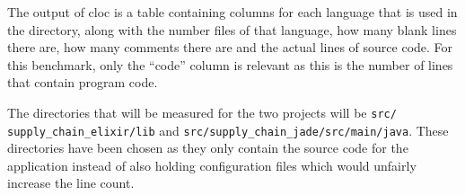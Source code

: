 The output of cloc is a table containing columns for each language that is used in the directory, along with the number files of that language, how many blank lines there are, how many comments there are and the actual lines of source code.
For this benchmark, only the ``code'' column is relevant as this is the number of lines that contain program code.

The directories that will be measured for the two projects will be \verb|src/|\\ \verb|supply_chain_elixir/lib| and \verb|src/supply_chain_jade/src/main/java|.
These directories have been chosen as they only contain the source code for the application instead of also holding configuration files which would unfairly increase the line count.
